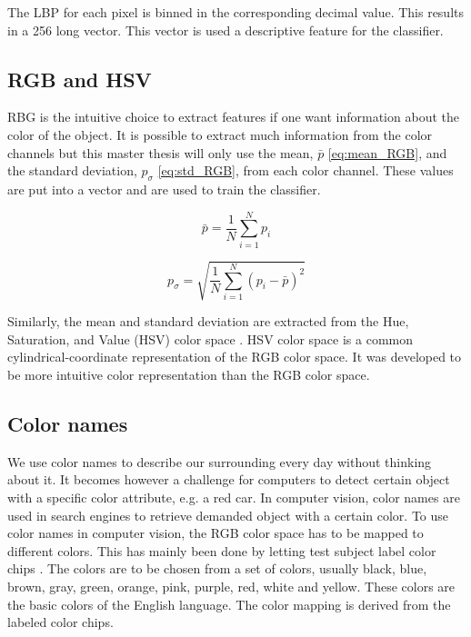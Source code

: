 The LBP for each pixel is binned in the corresponding decimal value. This results in a 256 long vector. This vector is used a descriptive feature for the classifier. 

\subsection{RGB and HSV} \label{subsection:RGB_HSV}

RBG is the intuitive choice to extract features if one want information about the color of the object. It is possible to extract much information from the color channels but this master thesis will only use the mean, $\bar{p}$ \cref{eq:mean_RGB}, and the standard deviation, $p_{\sigma}$ \cref{eq:std_RGB}, from each color channel. These values are put into a vector and are used to train the classifier.  

\begin{equation} \label{eq:mean_RGB}
\bar{p} = \frac{1}{N}\sum_{i = 1}^{N} p_i
\end{equation}

\begin{equation} \label{eq:std_RGB}
p_{\sigma} = \sqrt{\frac{1}{N}\sum_{i = 1}^{N}(p_i - \bar{p})^2}
\end{equation}

Similarly, the mean and standard deviation are extracted from the Hue, Saturation, and Value (HSV) color space \cite{hsv_color}. HSV color space is a common cylindrical-coordinate representation of the RGB color space. It was developed to be more intuitive color representation than the RGB color space.  

\subsection{Color names} \label{subsection:Color}

We use color names to describe our surrounding every day without thinking about it. It becomes however a challenge for computers to detect certain object with a specific color attribute, e.g. a red car. In computer vision, color names are used in search engines to retrieve demanded object with a certain color. To use color names in computer vision, the RGB color space has to be mapped to different colors. This has mainly been done by letting test subject label color chips \cite{griffin2006optimality}. The colors are to be chosen from a set of colors, usually black, blue, brown, gray, green, orange, pink, purple, red, white and yellow. These colors are the basic colors of the English language. The color mapping is derived from the labeled color chips. 

